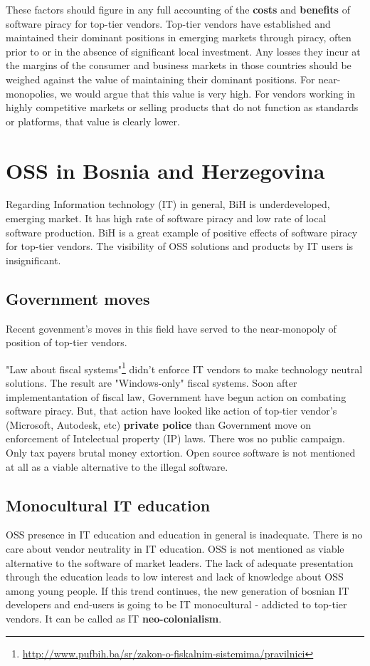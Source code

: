 \documentclass[times, utf8, seminar]{fit}
\begin{document}
These factors should figure in any full accounting of the \textbf{costs} and \textbf{benefits} of software piracy for top-tier vendors. Top-tier vendors have established and maintained their dominant positions in emerging markets through piracy, often prior to or in the absence of significant local investment. Any losses they incur at the margins of the consumer and business markets in those countries should be weighed against the value of maintaining their dominant positions. For near-monopolies, we would argue that this value is very high. For vendors working in highly competitive markets or selling products that do not function as standards or platforms, that value is clearly lower.\citep{mediapiracy}


\chapter{OSS in Bosnia and Herzegovina}

Regarding Information technology (IT) in general, BiH is underdeveloped, emerging market. It has high rate of software piracy and low rate of local software production. BiH is a great example of positive effects of software piracy for top-tier vendors. The visibility of OSS solutions and products by IT users is insignificant.

\section{Government moves}
Recent govenment's moves in this field have served to the near-monopoly of position of top-tier vendors. 

"Law about fiscal systems"\footnote{\url{http://www.pufbih.ba/sr/zakon-o-fiskalnim-sistemima/pravilnici}} didn't enforce IT vendors to make technology neutral solutions. The result are "Windows-only" fiscal systems. Soon after implementantation of fiscal law, Government have begun action on combating software piracy. But, that action have looked like action of top-tier vendor's (Microsoft, Autodesk, etc) \textbf{private police} than Government move on enforcement of Intelectual property (IP) laws. There wos no public campaign. Only tax payers brutal money extortion. Open source software is not mentioned at all as a viable alternative to the illegal software.

\section{Monocultural IT education}
OSS presence in IT education and education in general is inadequate. There is no care about vendor neutrality in IT education. OSS is not mentioned as viable alternative to the software of market leaders. The lack of adequate presentation through the education leads to low interest and lack of knowledge about OSS among young people. If this trend continues, the new generation of bosnian IT developers and end-users is going to be IT monocultural - addicted to top-tier vendors. It can be called as IT \textbf{neo-colonialism}.
\end{document}
